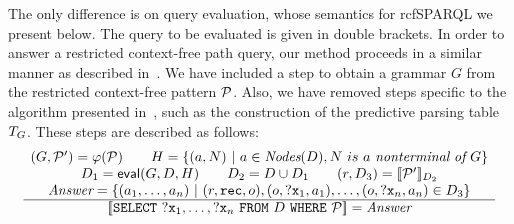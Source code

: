 \documentclass[runningheads]{llncs}
\begin{document}
The only difference is on query evaluation, whose semantics for \textsf{rcfSPARQL} we present below.
The query to be evaluated is given in double brackets.
In order to answer a restricted context-free path query, our method proceeds in a similar manner as described in~\cite{MEDEIROS2019}. 
We have included a step to obtain a grammar $G$ from the restricted context-free pattern ${\cal P}$.
Also, we have removed steps specific to the algorithm presented in~\cite{MEDEIROS2019}, such as the construction of the predictive parsing table $T_G$.
These steps are described as follows:
\[
\begin{array}{c} 
(G, {\cal P}') = \varphi({\cal P}) \qquad
H = \{ (a, N)\ |\ a \in \textit{Nodes}(D), N\ is\ a\ \textit{nonterminal}\ \textit{of}\ G \}
\\
D_1 = \textsf{eval}(G, D, H)
\qquad
D_2 = D \cup D_1
\qquad
(r, D_3) = [ \! [ {\cal P}' ] \! ]_{D_2}
\\
\textit{Answer} = \{ (a_1,\dots,a_n)\ |\ (r, \texttt{rec}, o), 
                                     (o, \mathtt{?x}_1, a_1), \dots, 
                                     (o, \mathtt{?x}_n, a_n) \in D_3 \}
 \\ \hline [ \! [ \texttt{SELECT}\ \mathtt{?x}_1, \dots, \mathtt{?x}_n\ \texttt{FROM}\ D\ \texttt{WHERE}\ {\cal P} ] \! ] = \textit{Answer} \end{array}
\]
\end{document}
